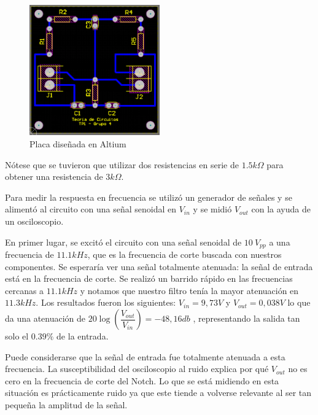 \begin{figure}[H]                                                       
    \centering\includegraphics[width=0.5\textwidth]{resources/placa_altium.png}
    \caption{Placa diseñada en Altium}
    \label{fig:placa_altium}
    \end{figure}

Nótese que se tuvieron que utilizar dos resistencias en serie de $1.5k\Omega$ para obtener una
resistencia de $3k\Omega$. 

Para medir la respuesta en frecuencia se utilizó un generador de señales y se alimentó al circuito con una señal senoidal en $V_{in}$ y se midió $V_{out}$ con la ayuda de un osciloscopio.

En primer lugar, se excitó el circuito con una señal senoidal de $10 \ V_{pp}$ a una frecuencia de $11.1kHz$, que es la frecuencia de corte buscada con nuestros componentes. Se esperaría ver una señal totalmente atenuada: la señal de entrada está en la frecuencia de corte. Se realizó un barrido rápido en las frecuencias cercanas a $11.1kHz$ y notamos que nuestro filtro tenía la mayor atenuación en $11.3kHz$. Los resultados fueron los siguientes: $V_{in}=9,73V$ y $V_{out}= 0,038V$ lo que da una atenuación de $20\log(\dfrac{V_{out}}{V_{in}}) = -48,16db$ , representando la salida tan solo el $0.39 \%$ de la entrada. 

Puede considerarse que la señal de entrada fue totalmente atenuada a esta frecuencia.
La susceptibilidad del osciloscopio al ruido explica por qué $V_{out}$ no es cero en la frecuencia de corte del Notch. Lo que se está midiendo en esta situación es prácticamente ruido ya que este tiende a volverse relevante al ser tan pequeña la amplitud de la señal. \\

